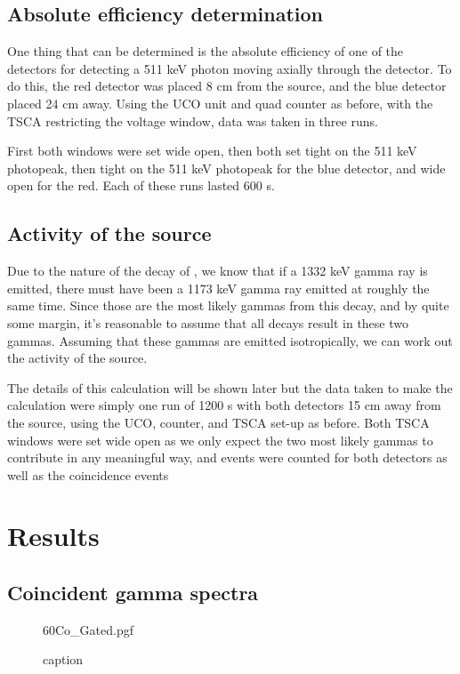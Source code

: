 \documentclass[11pt]{article}
\numberwithin{equation}{section}
\numberwithin{figure}{section}
\numberwithin{table}{section}
\begin{document}
\subsection{Absolute efficiency determination}
\par One thing that can be determined is the absolute efficiency of one of the detectors for detecting a 511 keV photon moving axially through the detector. To do this, the red detector was placed 8 cm from the  source, and the blue detector placed 24 cm away. Using the UCO unit and quad counter as before, with the TSCA restricting the voltage window, data was taken in three runs.
\par First both windows were set wide open, then both set tight on the 511 keV photopeak, then tight on the 511 keV photopeak for the blue detector, and wide open for the red. Each of these runs lasted 600 s.

\subsection{Activity of the  source}
\par Due to the nature of the decay of , we know that if a 1332 keV gamma ray is emitted, there must have been a 1173 keV gamma ray emitted at roughly the same time. Since those are the most likely gammas from this decay, and by quite some margin, it's reasonable to assume that all decays result in these two gammas. Assuming that these gammas are emitted isotropically, we can work out the activity of the  source. 
\par The details of this calculation will be shown later but the data taken to make the calculation were simply one run of 1200 s with both detectors 15 cm away from the source, using the UCO, counter, and TSCA set-up as before. Both TSCA windows were set wide open as we only expect the two most likely gammas to contribute in any meaningful way, and events were counted for both detectors as well as the coincidence events

\section{Results}\label{sec:Results}
\subsection{Coincident gamma spectra}

\begin{figure}[H]
    \begin{center}
       {60Co_Gated.pgf}
       \caption{caption}
       \label{label}
    \end{center}
\end{figure}
\end{document}
